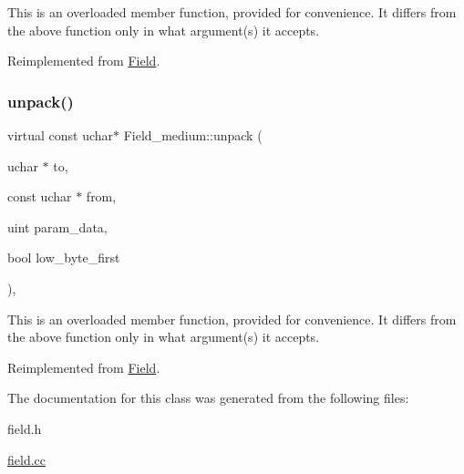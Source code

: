 This is an overloaded member function, provided for convenience. It differs from the above function only in what argument(s) it accepts.

Reimplemented from \mbox{\hyperlink{classField_a9eaff8d3425ef0e1da69b32cbd8f2879}{Field}}.

\mbox{\label{classField__medium_aa04c697b728c9f1f6c92164d85894030}} 
\subsubsection{\texorpdfstring{unpack()}{unpack()}}
{\footnotesize\ttfamily virtual const uchar$\ast$ Field\+\_\+medium\+::unpack (\begin{DoxyParamCaption}\item[{uchar $\ast$}]{to,  }\item[{const uchar $\ast$}]{from,  }\item[{uint}]{param\+\_\+data,  }\item[{bool}]{low\+\_\+byte\+\_\+first }\end{DoxyParamCaption})\hspace{0.3cm}{\ttfamily [inline]}, {\ttfamily [virtual]}}

This is an overloaded member function, provided for convenience. It differs from the above function only in what argument(s) it accepts.

Reimplemented from \mbox{\hyperlink{classField_a42f448ff2c939d91949f7635d939b16b}{Field}}.



The documentation for this class was generated from the following files\+:\begin{DoxyCompactItemize}
\item 
field.\+h\item 
\mbox{\hyperlink{field_8cc}{field.\+cc}}\end{DoxyCompactItemize}
